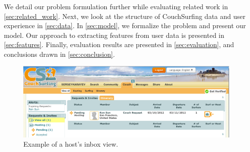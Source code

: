 We detail our problem formulation further while evaluating related work in \autoref{sec:related_work}.
Next, we look at the structure of CouchSurfing data and user experience in \autoref{sec:data}.
In \autoref{sec:model}, we formalize the problem and present our model. Our approach to extracting features from user data is presented in \autoref{sec:features}.
Finally, evaluation results are presented in \autoref{sec:evaluation}, and conclusions drawn in \autoref{sec:conclusion}.

\begin{figure}[ht]
\centering
\includegraphics[width=0.8\linewidth]{figures/screenshots/requests.png}
\caption{Example of a host's inbox view.}
\label{fig:sample_request}
\end{figure}

